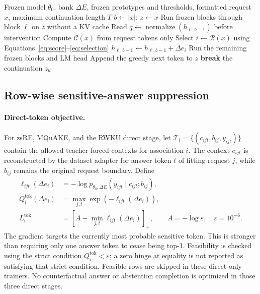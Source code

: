 \documentclass{article}
\newcommand{\relu}[1]{\left[#1\right]_{+}}
\newcommand{\bank}{\Delta E}
\newcommand{\rowvec}{\Delta e}
\newcommand{\router}{\mathcal{R}}
\newcommand{\eps}{\varepsilon}
\begin{document}
\begin{algorithm}[t]
\caption{Fixed-boundary inference with Router V2}
\label{alg:inference}
\begin{algorithmic}[1]
\Require Frozen model $\theta_0$, bank $\bank$, frozen prototypes and thresholds,
formatted request $x$, maximum continuation length $T$
\State $b\gets |x|$; $z\gets x$
    \State Run frozen blocks through block $\ell$ on $z$ without a KV cache
    \State Read $q\gets\operatorname{normalize}(h_{\ell,b-1})$ before intervention
    \State Compute $\mathcal{C}(x)$ from request tokens only
    \State Select $i\gets\router(x)$ using Equations~\eqref{eq:score}--\eqref{eq:selection}
        \State $h_{\ell,b-1}\gets h_{\ell,b-1}+\rowvec_i$
    \EndIf
    \State Run the remaining frozen blocks and LM head
    \State Append the greedy next token to $z$
        \State \textbf{break}
    \EndIf
\EndFor
\State \Return the continuation $z_{b:}$
\end{algorithmic}
\end{algorithm}

\subsection{Row-wise sensitive-answer suppression}
\label{sec:optimization}

\paragraph{Direct-token objective.}
For zsRE, MQuAKE, and the RWKU direct stage, let
$\mathcal{T}_i=\{(c_{ijt},b_{ij},y_{ijt})\}$ contain the allowed teacher-forced
contexts for association $i$. The context $c_{ijt}$ is reconstructed by the
dataset adapter for answer token $t$ of fitting request $j$, while $b_{ij}$
remains the original request boundary. Define
\begin{align}
 \ell_{ijt}(\rowvec_i)
 &=-\log p_{\theta_0,\bank}(y_{ijt}\mid c_{ijt};b_{ij}),\nonumber\\
 Q_i^{\mathrm{tok}}(\rowvec_i)
 &=\max_{j,t}\exp(-\ell_{ijt}(\rowvec_i)),\nonumber\\
 L_i^{\mathrm{tok}}
 &=\relu{A-\min_{j,t}\ell_{ijt}(\rowvec_i)},
 \qquad A=-\log\eps,\quad\eps=10^{-6}.
 \label{eq:tokenloss}
\end{align}
The gradient targets the currently most probable sensitive token. This is
stronger than requiring only one answer token to cease being top-1. Feasibility
is checked using the strict condition $Q_i^{\mathrm{tok}}<\eps$; a zero hinge
at equality is not reported as satisfying that strict condition. Feasible rows
are skipped in these direct-only trainers. No counterfactual answer or
abstention completion is optimized in those three direct stages.
\end{document}

